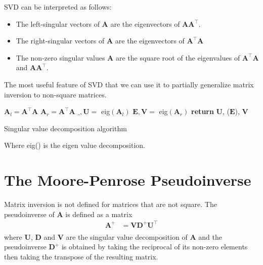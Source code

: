 \documentclass[12pt]{report}
\begin{document}
        SVD can be interpreted as follows:
        \begin{itemize}
            \item The left-singular vectors of $\boldsymbol{A}$ are the eigenvectors of $\boldsymbol{A}\boldsymbol{A}^\top$.
            \item The right-singular vectors of $\boldsymbol{A}$ are the eigenvectors of $\boldsymbol{A}^\top\boldsymbol{A}$
            \item The non-zero singular values $\boldsymbol{A}$ are the square root of the eigenvalues of $\boldsymbol{A}^\top \boldsymbol{A}$ and $\boldsymbol{A}\boldsymbol{A}^\top$.
        \end{itemize}
        The most useful feature of SVD that we can use it to partially generalize matrix inversion to non-square matrices.
        \newpage
        
        \begin{algorithm}[H]
            \SetAlgoLined
            \DontPrintSemicolon
            $\boldsymbol{A}_l = \boldsymbol{A}^\top \boldsymbol{A}$\;
            $\boldsymbol{A}_r = \boldsymbol{A}^\top \boldsymbol{A}$\;
            $\_, \boldsymbol{U} =$ eig$(\boldsymbol{A}_l)$\;
            $\boldsymbol{E}, \boldsymbol{V} =$ eig$(\boldsymbol{A}_r)$\;
            \textbf{return} $\boldsymbol{U}$, ($\boldsymbol{E}$), $\boldsymbol{V}$
            \caption{Singular value decomposition algorithm}
        \end{algorithm}
        Where eig() is the eigen value decomposition.
        
    \section{The Moore-Penrose Pseudoinverse}
        Matrix inversion is not defined for matrices that are not square. The pseudoinverse of $\boldsymbol{A}$ is defined as a matrix
        \begin{align}
            \boldsymbol{A}^+ &= \boldsymbol{V}\boldsymbol{D}^+ \boldsymbol{U}^\top \\
        \end{align}
        where $\boldsymbol{U}$, $\boldsymbol{D}$ and $\boldsymbol{V}$ are the singular value decomposition of $\boldsymbol{A}$ and the pseudoinverse $\boldsymbol{D}^+$ is obtained by taking the reciprocal of its non-zero elements then taking the transpose of the resulting matrix.
        
\end{document}
